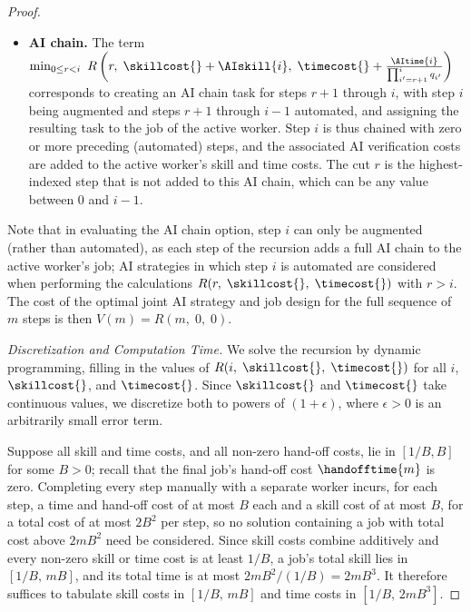 \begin{proof}
\begin{itemize}
    \item \textbf{AI chain.}
    The term $\min_{0 \le r < i} \ R\left(r,\; \skillcost{} + \AIskill{i},\; \timecost{} + \frac{\AItime{i}}{\prod_{i'=r+1}^{i} q_{i'}}\right)$ corresponds to creating an AI chain task for steps $r+1$ through $i$, with step $i$ being augmented and steps $r+1$ through $i-1$ automated, and assigning the resulting task to the job of the active worker.
    Step $i$ is thus chained with zero or more preceding (automated) steps, and the associated AI verification costs are added to the active worker's skill and time costs.
    The cut $r$ is the highest-indexed step that is not added to this AI chain, which can be any value between $0$ and $i-1$.
\end{itemize}
Note that in evaluating the AI chain option, step $i$ can only be augmented (rather than automated), as each step of the recursion adds a full AI chain to the active worker's job; AI strategies in which step $i$ is automated are considered when performing the calculations $R(r,\; \skillcost{},\; \timecost{})$ with $r > i$.
The cost of the optimal joint AI strategy and job design for the full sequence of $m$ steps is then $V(m) = R(m,\; 0,\; 0)$.

\emph{Discretization and Computation Time.}
We solve the recursion by dynamic programming, filling in the values of $R(i,\; \skillcost{},\; \timecost{})$ for all $i$, $\skillcost{}$, and $\timecost{}$.
Since $\skillcost{}$ and $\timecost{}$ take continuous values, we discretize both to powers of $(1+\epsilon)$, where $\epsilon > 0$ is an arbitrarily small error term.

Suppose all skill and time costs, and all non-zero hand-off costs, lie in $[1/B, B]$ for some $B > 0$; recall that the final job's hand-off cost $\handofftime{m}$ is zero.
Completing every step manually with a separate worker incurs, for each step, a time and hand-off cost of at most $B$ each and a skill cost of at most $B$, for a total cost of at most $2B^2$ per step, so no solution containing a job with total cost above $2mB^2$ need be considered.
Since skill costs combine additively and every non-zero skill or time cost is at least $1/B$, a job's total skill lies in $[1/B,\, mB]$, and its total time is at most $2mB^2/(1/B) = 2mB^3$.
It therefore suffices to tabulate skill costs in $[1/B,\, mB]$ and time costs in $[1/B,\, 2mB^3]$.


\end{proof}
